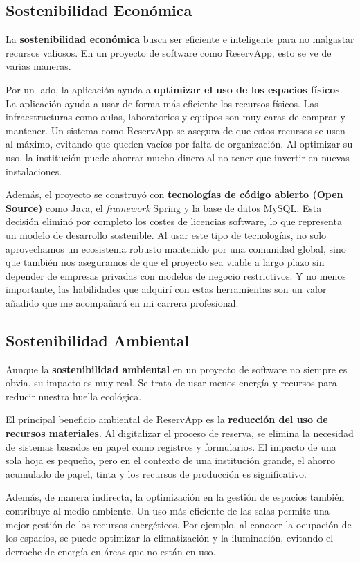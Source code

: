 \subsection{Sostenibilidad Económica}
La \textbf{sostenibilidad económica} busca ser eficiente e inteligente para no malgastar recursos valiosos. En un proyecto de software como ReservApp, esto se ve de varias maneras.

Por un lado, la aplicación ayuda a \textbf{optimizar el uso de los espacios físicos}. La aplicación ayuda a usar de forma más eficiente los recursos físicos. Las infraestructuras como aulas, laboratorios y equipos son muy caras de comprar y mantener. Un sistema como ReservApp se asegura de que estos recursos se usen al máximo, evitando que queden vacíos por falta de organización. Al optimizar su uso, la institución puede ahorrar mucho dinero al no tener que invertir en nuevas instalaciones.

Además, el proyecto se construyó con \textbf{tecnologías de código abierto (Open Source)} como Java, el \emph{framework} Spring y la base de datos MySQL. Esta decisión eliminó por completo los costes de licencias software, lo que representa un modelo de desarrollo sostenible. Al usar este tipo de tecnologías, no solo aprovechamos un ecosistema robusto mantenido por una comunidad global, sino que también nos aseguramos de que el proyecto sea viable a largo plazo sin depender de empresas privadas con modelos de negocio restrictivos. Y no menos importante, las habilidades que adquirí con estas herramientas son un valor añadido que me acompañará en mi carrera profesional.

\subsection{Sostenibilidad Ambiental}
Aunque la \textbf{sostenibilidad ambiental} en un proyecto de software no siempre es obvia, su impacto es muy real. Se trata de usar menos energía y recursos para reducir nuestra huella ecológica.

El principal beneficio ambiental de ReservApp es la \textbf{reducción del uso de recursos materiales}. Al digitalizar el proceso de reserva, se elimina la necesidad de sistemas basados en papel como registros y formularios. El impacto de una sola hoja es pequeño, pero en el contexto de una institución grande, el ahorro acumulado de papel, tinta y los recursos de producción es significativo.

Además, de manera indirecta, la optimización en la gestión de espacios también contribuye al medio ambiente. Un uso más eficiente de las salas permite una mejor gestión de los recursos energéticos. Por ejemplo, al conocer la ocupación de los espacios, se puede optimizar la climatización y la iluminación, evitando el derroche de energía en áreas que no están en uso.

